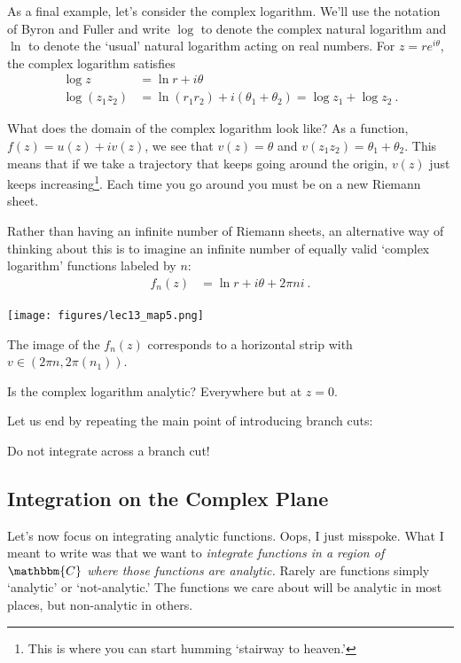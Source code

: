 As a final example, let's consider the complex logarithm. We'll use the notation of Byron and Fuller and write $\log$ to denote the complex natural logarithm and $\ln$ to denote the `usual' natural logarithm acting on real numbers. For $z=r e^{i\theta}$, the complex logarithm satisfies
\begin{align}
	\log z &= \ln r + i \theta
	\\
	\log(z_1z_2)
	&=\ln(r_1r_2) + i (\theta_1+\theta_2)
	= \log z_1 + \log z_2 \ .
\end{align}
\begin{example}
What does the domain of the complex logarithm look like? As a function, $f(z) = u(z) + i v(z)$, we see that $v(z) = \theta$ and $v(z_1z_2)=\theta_1+\theta_2$. This means that if we take a trajectory that keeps going around the origin, $v(z)$ just keeps increasing\footnote{This is where you can start humming `stairway to heaven.'}. Each time you go around you must be on a new Riemann sheet. 
\end{example}
Rather than having an infinite number of Riemann sheets, an alternative way of thinking about this is to imagine an infinite number of equally valid `complex logarithm' functions labeled by $n$:
\begin{align}
	f_n(z) &= \ln r + i \theta + 2\pi n i \ .
\end{align}
\begin{center}
\texttt{[image: figures/lec13\_map5.png]}
\end{center}
The image of the $f_n(z)$ corresponds to a horizontal strip with $v\in \left(2\pi n, 2\pi(n_1)\right)$.
\begin{example}
Is the complex logarithm analytic? Everywhere but at $z=0$.
\end{example}
Let us end by repeating the main point of introducing branch cuts:
\begin{framed}
\begin{center}
Do not integrate across a branch cut!
\end{center}
\end{framed}

\subsection{Integration on the Complex Plane}

Let's now focus on integrating analytic functions. Oops, I just misspoke. What I meant to write was that we want to \emph{integrate functions in a region of $\mathbbm{C}$ where those functions are analytic.} Rarely are functions simply `analytic' or `not-analytic.' The functions we care about will be analytic in most places, but non-analytic in others. 

